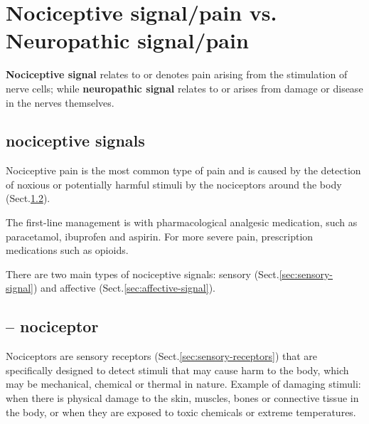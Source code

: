  
 

\section{Nociceptive signal/pain vs. Neuropathic signal/pain}

{\bf Nociceptive signal} relates to or denotes pain arising from the
stimulation of nerve cells; while {\bf neuropathic signal} relates to 
or arises from damage or disease in the nerves themselves.

\subsection{nociceptive signals}
\label{sec:nociceptive-signal}

Nociceptive pain is the most common type of pain and is caused by the detection
of noxious or potentially harmful stimuli by the nociceptors around the body
(Sect.\ref{sec:nociceptor}).

\begin{mdframed}
The first-line management is with pharmacological analgesic medication, such as
paracetamol, ibuprofen and aspirin. For more severe pain, prescription
medications such as opioids.
\end{mdframed}


There are two main types of nociceptive signals: sensory
(Sect.\ref{sec:sensory-signal}) and affective (Sect.\ref{sec:affective-signal}).

\subsection{-- nociceptor}
\label{sec:nociceptor}

Nociceptors are sensory receptors (Sect.\ref{sec:sensory-receptors}) that are specifically
designed to detect stimuli that may cause harm to the body, which may be
mechanical, chemical or thermal in nature.
Example of damaging stimuli: when there is physical damage to the skin, muscles,
bones or connective tissue in the body, or when they are exposed to toxic
chemicals or extreme temperatures.


